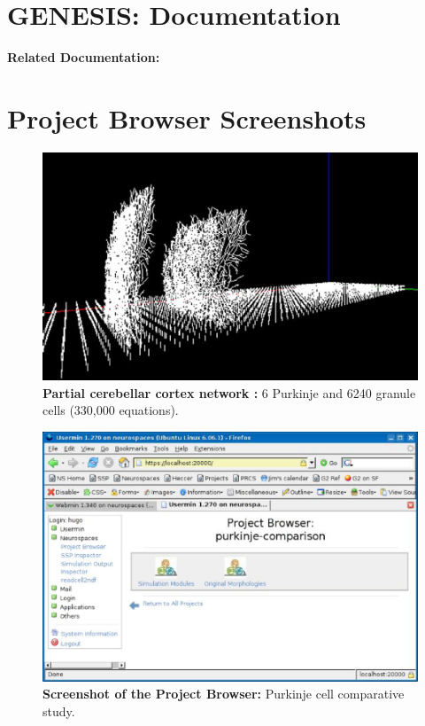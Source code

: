 \documentclass[12pt]{article}
\begin{document}
\section*{GENESIS: Documentation}

{\bf Related Documentation:}

\section*{Project Browser Screenshots}

\begin{figure}[h]
  \centering
 \includegraphics[scale=0.5]{figures/screenshot-1.eps}
\caption{{\bf Partial cerebellar cortex network :} 6 Purkinje and 6240 granule cells (330,000 equations).}
  \label{fig:pb-1}
\end{figure}


\begin{figure}[h]
  \centering
 \includegraphics[scale=0.6]{figures/screenshot-3.eps}
 \caption{{\bf Screenshot of the Project Browser:} Purkinje cell comparative study.}
  \label{fig:pb-3}
\end{figure}
\end{document}
